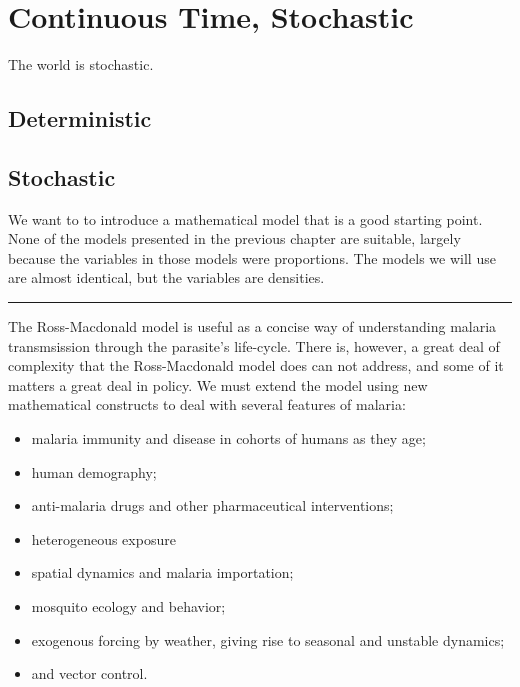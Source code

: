 \documentclass[
]{book}
\begin{document}
\section{Continuous Time, Stochastic}\label{continuous-time-stochastic}

The world is stochastic.

\subsection{Deterministic}\label{deterministic}

\subsection{Stochastic}\label{stochastic}

We want to to introduce a mathematical model that is a good starting point. None of the models presented in the previous chapter are suitable, largely because the variables in those models were proportions. The models we will use are almost identical, but the variables are densities.

\begin{center}\rule{0.5\linewidth}{0.5pt}\end{center}

The Ross-Macdonald model is useful as a concise way of understanding malaria transmsission through the parasite's life-cycle. There is, however, a great deal of complexity that the Ross-Macdonald model does can not address, and some of it matters a great deal in policy. We must extend the model using new mathematical constructs to deal with several features of malaria:

\begin{itemize}
\item
  malaria immunity and disease in cohorts of humans as they age;
\item
  human demography;
\item
  anti-malaria drugs and other pharmaceutical interventions;
\item
  heterogeneous exposure
\item
  spatial dynamics and malaria importation;
\item
  mosquito ecology and behavior;
\item
  exogenous forcing by weather, giving rise to seasonal and unstable dynamics;
\item
  and vector control.
\end{itemize}
\end{document}
